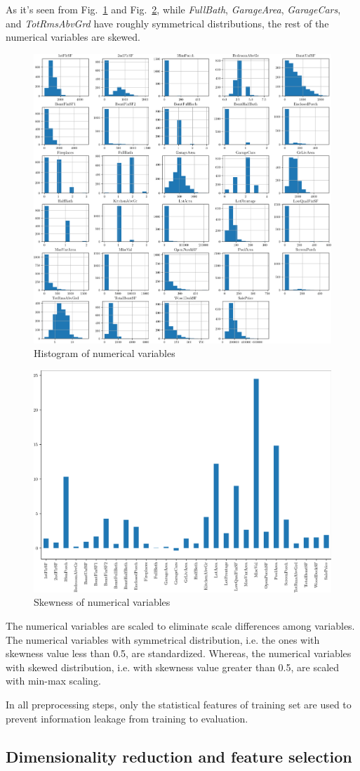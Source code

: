 \documentclass[conference]{IEEEtran}
\begin{document}
As it's seen from Fig.~\ref{fig:numericals-histogram} and Fig.~\ref{fig:numericals-skewness-bar}, 
while \textit{FullBath}, \textit{GarageArea}, \textit{GarageCars}, and \textit{TotRmsAbvGrd} 
have roughly symmetrical distributions, the rest of the numerical variables are skewed.
\begin{figure}[htbp]
    \centerline{\includegraphics[width = 0.5 \textwidth]{numericals-histogram.png}}
    \caption{Histogram of numerical variables}
    \label{fig:numericals-histogram}
\end{figure}
\begin{figure}[htbp]
    \centerline{\includegraphics[width = 0.5 \textwidth]{numericals-skewness-bar.png}}
    \caption{Skewness of numerical variables}
    \label{fig:numericals-skewness-bar}
\end{figure}
The numerical variables are scaled to eliminate scale differences among variables.
The numerical variables with symmetrical distribution, 
i.e. the ones with skewness value less than 0.5, are standardized. 
Whereas, the numerical variables with skewed distribution, i.e. with skewness value greater than 0.5, are scaled with min-max scaling.

In all preprocessing steps, only the statistical features of training set are used to 
prevent information leakage from training to evaluation.

\subsection{Dimensionality reduction and feature selection}
\end{document}
